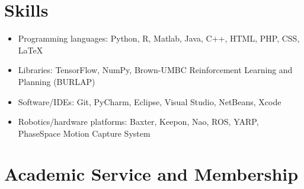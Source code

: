 \documentclass[10pt,letterpaper]{article}
\begin{document}
\section{Skills}
\begin{itemize}%
\item Programming languages: Python, R, Matlab, Java, C++, HTML, PHP, CSS, LaTeX
\item Libraries: TensorFlow, NumPy, Brown-UMBC Reinforcement Learning and Planning (BURLAP)
\item Software/IDEs: Git, PyCharm, Eclipse, Visual Studio, NetBeans, Xcode
\item Robotics/hardware platforms: Baxter, Keepon, Nao, ROS, YARP, PhaseSpace Motion Capture System
\end{itemize}

\section{Academic Service and Membership}
\end{document}

